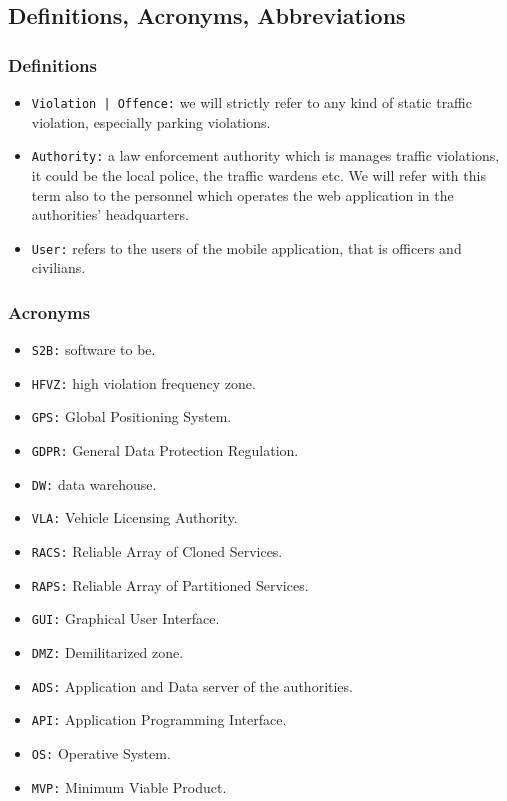 \documentclass[12pt,a4paper]{article}
\begin{document}
\subsection{Definitions, Acronyms, Abbreviations}
\subsubsection{Definitions}
\begin{itemize}
\item \texttt{Violation | Offence:} we will strictly refer to any kind of static traffic violation, especially parking violations. 
\item \texttt{Authority:} a law enforcement authority which is manages traffic violations, it could be the local police, the traffic wardens etc. We will refer with this term also to the personnel which operates the web application in the authorities' headquarters.
\item \texttt{User:} refers to the users of the mobile application, that is officers and civilians.
\end{itemize}
\subsubsection{Acronyms}
\begin{itemize}
\item \texttt{S2B:} software to be.
\item \texttt{HFVZ:} high violation frequency zone.
\item \texttt{GPS:} Global Positioning System.
\item \texttt{GDPR:} General Data Protection Regulation.
\item \texttt{DW:} data warehouse.
\item \texttt{VLA:} Vehicle Licensing Authority.
\item \texttt{RACS:} Reliable Array of Cloned Services.
\item \texttt{RAPS:} Reliable Array of Partitioned Services.
\item \texttt{GUI:} Graphical User Interface.
\item \texttt{DMZ:} Demilitarized zone.
\item \texttt{ADS:} Application and Data server of the authorities.
\item \texttt{API:} Application Programming Interface.
\item \texttt{OS:} Operative System.
\item \texttt{MVP:} Minimum Viable Product.
\end{itemize}
\end{document}
